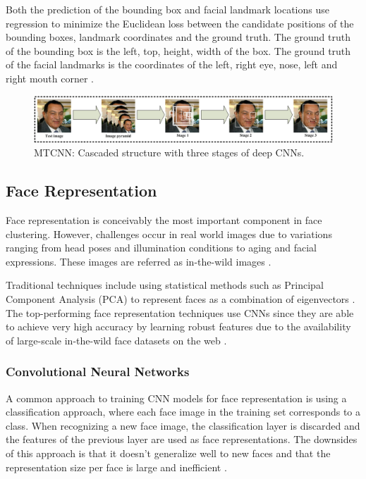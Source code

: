 \documentclass[12pt,english]{article}
\begin{document}
Both the prediction of the bounding box and facial landmark locations use regression to minimize the Euclidean loss between the candidate positions of the bounding boxes, landmark coordinates and the ground truth. The ground truth of the bounding box is the left, top, height, width of the box. The ground truth of the facial landmarks is the coordinates of the left, right eye, nose, left and right mouth corner \cite{zhang}.


\begin{figure}[!tbp]
 \centering
    \includegraphics[width=\columnwidth]{figures/mtcnn_pipeline2.png}
    \caption{MTCNN: Cascaded structure with three stages of deep CNNs. \cite{zhang}}
	\label{fig:mtcnn}
\end{figure}


\subsection{Face Representation}

\quad
Face representation is conceivably the most important component in face clustering. However, challenges occur in real world images due to variations ranging from head poses and illumination conditions to aging and facial expressions. These images are referred as in-the-wild images \cite{trigueros}.

Traditional techniques include using statistical methods such as Principal Component Analysis (PCA) to represent faces as a combination of eigenvectors \cite{amos}. The top-performing face representation techniques use CNNs \cite{amos} since they are able to achieve very high accuracy by learning robust features due to the availability of large-scale in-the-wild face datasets on the web \cite{trigueros}.  

\subsubsection{Convolutional Neural Networks}
\quad
A common approach to training CNN models for face representation is using a classification approach, where each face image in the training set corresponds to a class. When recognizing a new face image, the classification layer is discarded and the features of the previous layer are used as face representations. The downsides of this approach is that it doesn't generalize well to new faces and that the representation size per face is large and inefficient \cite{schroff}.
\end{document}

